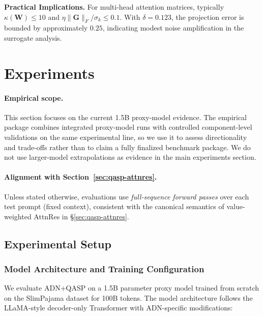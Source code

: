 \documentclass[twocolumn]{article}
\begin{document}
\textbf{Practical Implications.} For multi-head attention matrices, typically $\kappa(\mathbf{W}) \leq 10$ and $\eta \|\mathbf{G}\|_F / \sigma_k \leq 0.1$. With $\delta = 0.123$, the projection error is bounded by approximately $0.25$, indicating modest noise amplification in the surrogate analysis.



\section{Experiments}
\label{sec:experiments}

\paragraph{Empirical scope.}
This section focuses on the current 1.5B proxy-model evidence. The empirical package combines integrated proxy-model runs with controlled component-level validations on the same experimental line, so we use it to assess directionality and trade-offs rather than to claim a fully finalized benchmark package. We do not use larger-model extrapolations as evidence in the main experiments section.

\paragraph{Alignment with Section~\ref{sec:qasp-attnres}.}
Unless stated otherwise, evaluations use \emph{full-sequence forward passes} over each test prompt (fixed context), consistent with the canonical semantics of value-weighted AttnRes in \S\ref{sec:qasp-attnres}.

\subsection{Experimental Setup}

\subsubsection{Model Architecture and Training Configuration}

We evaluate ADN+QASP on a 1.5B parameter proxy model trained from scratch on the SlimPajama dataset for 100B tokens. The model architecture follows the LLaMA-style decoder-only Transformer with ADN-specific modifications:
\end{document}
